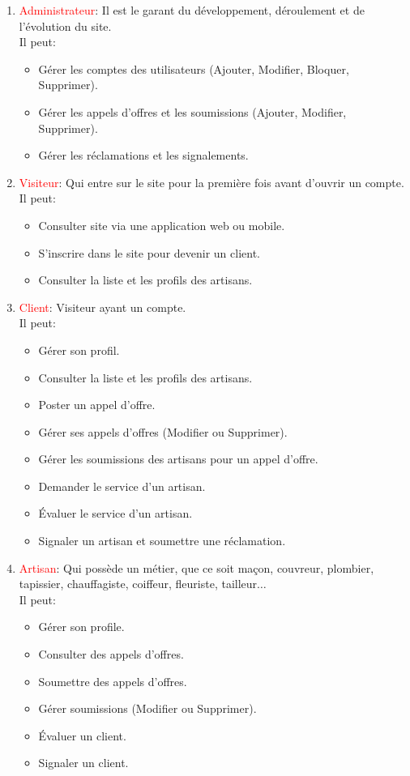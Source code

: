 \begin{enumerate}
	\item \textcolor{red}{Administrateur}: Il est le garant du développement, déroulement  et de l'évolution du site.\\
	Il peut:
	\begin{itemize}
		\item Gérer les comptes des utilisateurs (Ajouter, Modifier, Bloquer, Supprimer).
		\item Gérer les appels d’offres et les soumissions (Ajouter, Modifier, Supprimer).
		\item Gérer les réclamations et les signalements.
	\end{itemize}

	\item \textcolor{red}{Visiteur}: Qui entre sur le site pour la première fois avant d'ouvrir un compte.\\
	Il peut:
	\begin{itemize}
		\item Consulter site  via une application web ou mobile.
		\item S'inscrire dans le site pour devenir un client.
		\item Consulter la liste et les profils des artisans.
	\end{itemize}

	\item \textcolor{red}{Client}: Visiteur ayant un compte.\\
	Il peut:
	\begin{itemize}
		\item Gérer son profil.
		\item Consulter la liste et les profils des artisans.
		\item Poster un appel d’offre.
		\item Gérer ses appels d’offres (Modifier ou Supprimer).
		\item Gérer les soumissions des artisans pour un appel d’offre.
		\item Demander le service d’un artisan.
		\item Évaluer le service d’un artisan.
		\item Signaler un artisan et soumettre une réclamation.
	\end{itemize}

	\item \textcolor{red}{Artisan}: Qui possède un métier, que ce soit maçon, couvreur, plombier, tapissier, chauffagiste, coiffeur, fleuriste, tailleur$\dots$\\
	Il peut:
	\begin{itemize}
		\item Gérer son profile.
		\item Consulter des appels d’offres.
		\item Soumettre des appels d’offres.
		\item Gérer soumissions (Modifier ou Supprimer).
		\item Évaluer un client.
		\item Signaler un client.
	\end{itemize}
\end{enumerate}

